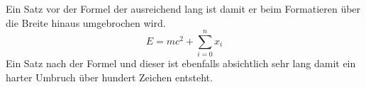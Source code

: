 Ein Satz vor der Formel der ausreichend lang ist damit er beim Formatieren über die Breite hinaus
umgebrochen wird.
\[
E = mc^2 + \sum_{i=0}^{n} x_i
\]
Ein Satz nach der Formel und dieser ist ebenfalls absichtlich sehr lang damit ein harter Umbruch
über hundert Zeichen entsteht.
